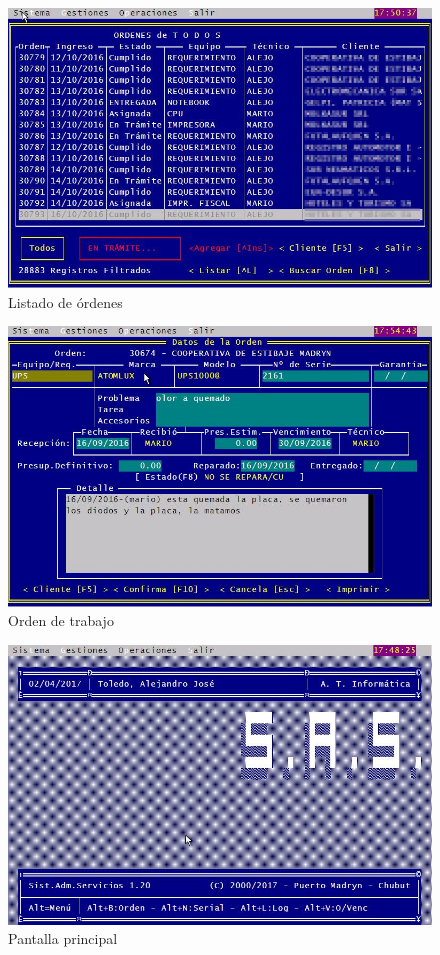 \documentclass[12pt]{extarticle}
\begin{document}
	\begin{figure}[h]
	\includegraphics[scale=0.5]{images/listado_ordenes.jpg}
	\caption{Listado de órdenes}
	\end{figure}

	\begin{figure}[h]
	\includegraphics[scale=0.5]{images/orden.jpg}
	\caption{Orden de trabajo}
	\end{figure}

	\begin{figure}[h]
	\includegraphics[scale=0.5]{images/pantalla_principal.jpg}
	\caption{Pantalla principal}
	\end{figure}
\end{document}
